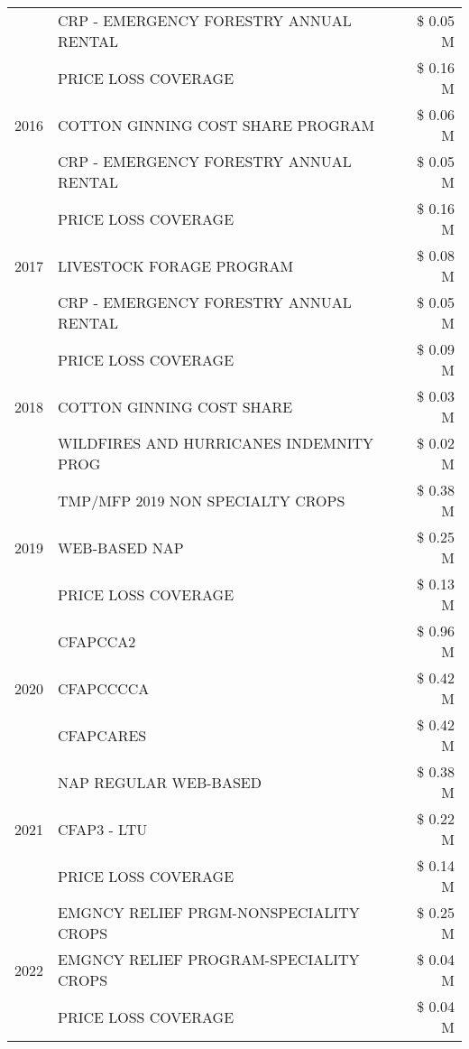 \begin{tabular}{llr}
 & CRP - EMERGENCY FORESTRY ANNUAL RENTAL & \$ 0.05 M \\
\cline{1-3}
\multirow[t]{3}{*}{2016} & PRICE LOSS COVERAGE & \$ 0.16 M \\
 & COTTON GINNING COST SHARE PROGRAM & \$ 0.06 M \\
 & CRP - EMERGENCY FORESTRY ANNUAL RENTAL & \$ 0.05 M \\
\cline{1-3}
\multirow[t]{3}{*}{2017} & PRICE LOSS COVERAGE & \$ 0.16 M \\
 & LIVESTOCK FORAGE PROGRAM & \$ 0.08 M \\
 & CRP - EMERGENCY FORESTRY ANNUAL RENTAL & \$ 0.05 M \\
\cline{1-3}
\multirow[t]{3}{*}{2018} & PRICE LOSS COVERAGE & \$ 0.09 M \\
 & COTTON GINNING COST SHARE & \$ 0.03 M \\
 & WILDFIRES AND HURRICANES INDEMNITY PROG & \$ 0.02 M \\
\cline{1-3}
\multirow[t]{3}{*}{2019} & TMP/MFP 2019 NON SPECIALTY CROPS & \$ 0.38 M \\
 & WEB-BASED NAP & \$ 0.25 M \\
 & PRICE LOSS COVERAGE & \$ 0.13 M \\
\cline{1-3}
\multirow[t]{3}{*}{2020} & CFAPCCA2 & \$ 0.96 M \\
 & CFAPCCCCA & \$ 0.42 M \\
 & CFAPCARES & \$ 0.42 M \\
\cline{1-3}
\multirow[t]{3}{*}{2021} & NAP REGULAR WEB-BASED & \$ 0.38 M \\
 & CFAP3 - LTU & \$ 0.22 M \\
 & PRICE LOSS COVERAGE & \$ 0.14 M \\
\cline{1-3}
\multirow[t]{3}{*}{2022} & EMGNCY RELIEF PRGM-NONSPECIALITY CROPS & \$ 0.25 M \\
 & EMGNCY RELIEF PROGRAM-SPECIALITY CROPS & \$ 0.04 M \\
 & PRICE LOSS COVERAGE & \$ 0.04 M \\
\cline{1-3}
\bottomrule
\end{tabular}
